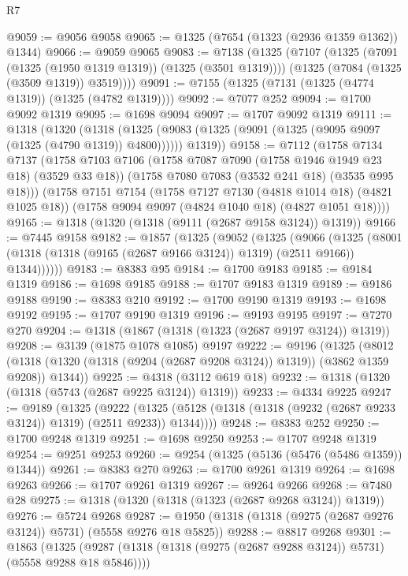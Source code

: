 \begin{lexlean}{R7}
\begin{coremodule}
@9059 := @9056 @9058
@9065 := @1325 (@7654 (@1323 (@2936 @1359 @1362)) @1344)
@9066 := @9059 @9065
@9083 := @7138
    (@1325
      (@7107
        (@1325 (@7091 (@1325 (@1950 @1319 @1319)) (@1325 (@3501 @1319))))
        (@1325 (@7084 (@1325 (@3509 @1319)) @3519))))
@9091 := @7155 (@1325 (@7131 (@1325 (@4774 @1319)) (@1325 (@4782 @1319))))
@9092 := @7077 @252
@9094 := @1700 @9092 @1319
@9095 := @1698 @9094
@9097 := @1707 @9092 @1319
@9111 := @1318
    (@1320
      (@1318
        (@1325 (@9083 (@1325 (@9091 (@1325 (@9095 @9097 (@1325 (@4790 @1319)) @4800))))))
        @1319))
@9158 := @7112
    (@1758
      @7134
      @7137
      (@1758
        @7103
        @7106
        (@1758 @7087 @7090 (@1758 @1946 @1949 @23 @18) (@3529 @33 @18))
        (@1758 @7080 @7083 (@3532 @241 @18) (@3535 @995 @18)))
      (@1758
        @7151
        @7154
        (@1758 @7127 @7130 (@4818 @1014 @18) (@4821 @1025 @18))
        (@1758 @9094 @9097 (@4824 @1040 @18) (@4827 @1051 @18))))
@9165 := @1318 (@1320 (@1318 (@9111 (@2687 @9158 @3124)) @1319))
@9166 := @7445 @9158
@9182 := @1857
    (@1325
      (@9052
        (@1325
          (@9066
            (@1325
              (@8001 (@1318 (@1318 (@9165 (@2687 @9166 @3124)) @1319) (@2511 @9166)) @1344))))))
@9183 := @8383 @95
@9184 := @1700 @9183
@9185 := @9184 @1319
@9186 := @1698 @9185
@9188 := @1707 @9183 @1319
@9189 := @9186 @9188
@9190 := @8383 @210
@9192 := @1700 @9190 @1319
@9193 := @1698 @9192
@9195 := @1707 @9190 @1319
@9196 := @9193 @9195
@9197 := @7270 @270
@9204 := @1318 (@1867 (@1318 (@1323 (@2687 @9197 @3124)) @1319))
@9208 := @3139 (@1875 @1078 @1085) @9197
@9222 := @9196
    (@1325
      (@8012 (@1318 (@1320 (@1318 (@9204 (@2687 @9208 @3124)) @1319)) (@3862 @1359 @9208)) @1344))
@9225 := @4318 (@3112 @619 @18)
@9232 := @1318 (@1320 (@1318 (@5743 (@2687 @9225 @3124)) @1319))
@9233 := @4334 @9225
@9247 := @9189
    (@1325
      (@9222 (@1325 (@5128 (@1318 (@1318 (@9232 (@2687 @9233 @3124)) @1319) (@2511 @9233)) @1344))))
@9248 := @8383 @252
@9250 := @1700 @9248 @1319
@9251 := @1698 @9250
@9253 := @1707 @9248 @1319
@9254 := @9251 @9253
@9260 := @9254 (@1325 (@5136 (@5476 (@5486 @1359)) @1344))
@9261 := @8383 @270
@9263 := @1700 @9261 @1319
@9264 := @1698 @9263
@9266 := @1707 @9261 @1319
@9267 := @9264 @9266
@9268 := @7480 @28
@9275 := @1318 (@1320 (@1318 (@1323 (@2687 @9268 @3124)) @1319))
@9276 := @5724 @9268
@9287 := @1950 (@1318 (@1318 (@9275 (@2687 @9276 @3124)) @5731) (@5558 @9276 @18 @5825))
@9288 := @8817 @9268
@9301 := @1863
    (@1325 (@9287 (@1318 (@1318 (@9275 (@2687 @9288 @3124)) @5731) (@5558 @9288 @18 @5846))))

\end{coremodule}
\end{lexlean}
